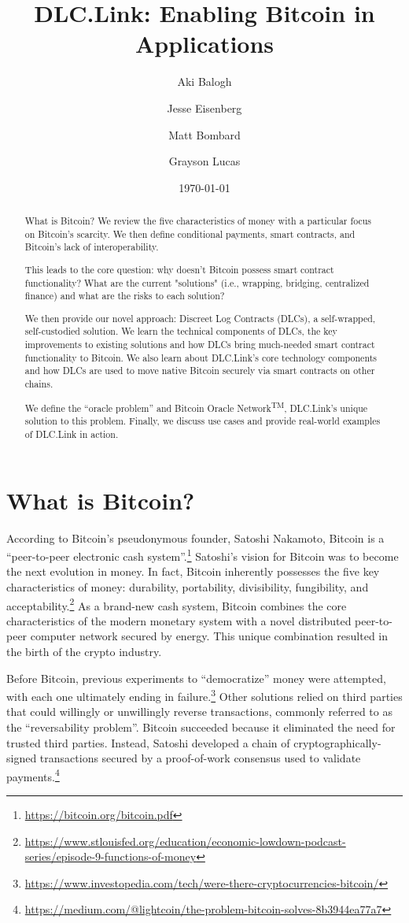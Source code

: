 \documentclass[twoside, a4paper, 11pt]{article}
\title{DLC.Link: Enabling Bitcoin in Applications}
\author{Aki Balogh \and Jesse Eisenberg \and Matt Bombard \and Grayson Lucas}
\date{\today}
\begin{document}
\maketitle
  \begin{abstract}
    What is Bitcoin? We review the five characteristics of money with a particular focus on Bitcoin’s scarcity. We then define conditional payments, smart contracts, and Bitcoin's lack of interoperability.

    This leads to the core question: why doesn’t Bitcoin possess smart contract functionality? What are the current "solutions" (i.e., wrapping, bridging, centralized finance) and what are the risks to each solution?

    We then provide our novel approach: Discreet Log Contracts (DLCs), a self-wrapped, self-custodied solution. We learn the technical components of DLCs, the key improvements to existing solutions and how DLCs bring much-needed smart contract functionality to Bitcoin. We also learn about DLC.Link’s core technology components and how DLCs are used to move native Bitcoin securely via smart contracts on other chains.

    We define the “oracle problem” and Bitcoin Oracle Network\textsuperscript{TM}, DLC.Link’s unique solution to this problem. Finally, we discuss use cases and provide real-world examples of DLC.Link in action.
  \end{abstract}

  \section{What is Bitcoin?}
  According to Bitcoin’s pseudonymous founder, Satoshi Nakamoto, Bitcoin is a “peer-to-peer electronic cash system”.\footnote{\url{https://bitcoin.org/bitcoin.pdf}} Satoshi’s vision for Bitcoin was to become the next evolution in money. In fact, Bitcoin inherently possesses the five key characteristics of money: durability, portability, divisibility, fungibility, and acceptability.\footnote{\url{https://www.stlouisfed.org/education/economic-lowdown-podcast-series/episode-9-functions-of-money}} As a brand-new cash system, Bitcoin combines the core characteristics of the modern monetary system with a novel distributed peer-to-peer computer network secured by energy. This unique combination resulted in the birth of the crypto industry.

  Before Bitcoin, previous experiments to “democratize” money were attempted, with each one ultimately ending in failure.\footnote{\url{https://www.investopedia.com/tech/were-there-cryptocurrencies-bitcoin/}} Other solutions relied on third parties that could willingly or unwillingly reverse transactions, commonly referred to as the “reversability problem”. Bitcoin succeeded because it eliminated the need for trusted third parties. Instead, Satoshi developed a chain of cryptographically-signed transactions secured by a proof-of-work consensus used to validate payments.\footnote{\url{https://medium.com/@lightcoin/the-problem-bitcoin-solves-8b3944ea77a7}}
\end{document}
